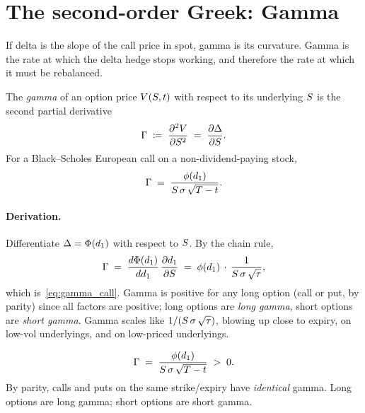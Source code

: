 \section{The second-order Greek: Gamma}
\label{sec:ch16_gamma}

If delta is the slope of the call price in spot, gamma is its
curvature. Gamma is the rate at which the delta hedge stops working,
and therefore the rate at which it must be rebalanced.

\begin{definition}[Gamma]
The \emph{gamma} of an option price $V(S, t)$ with respect to its
underlying $S$ is the second partial derivative
\begin{equation}
  \Gamma \;\coloneqq\; \frac{\partial^2 V}{\partial S^2}
                 \;=\; \frac{\partial \Delta}{\partial S}.
  \label{eq:gamma_def}
\end{equation}
For a Black--Scholes European call on a non-dividend-paying stock,
\begin{equation}
  \Gamma \;=\; \frac{\phi(d_1)}{S\,\sigma\,\sqrt{T - t}}.
  \label{eq:gamma_call}
\end{equation}
\end{definition}

\paragraph{Derivation.} Differentiate $\Delta = \Phi(d_1)$ with
respect to $S$. By the chain rule,
\begin{equation*}
  \Gamma \;=\; \frac{d \Phi(d_1)}{d d_1}\,\frac{\partial d_1}{\partial S}
        \;=\; \phi(d_1)\,\cdot\,\frac{1}{S\,\sigma\,\sqrt{\tau}},
\end{equation*}
which is~\eqref{eq:gamma_call}. Gamma is positive for any long
option (call or put, by parity) since all factors are positive;
long options are \emph{long gamma}, short options are \emph{short
gamma}. Gamma scales like $1/(S\,\sigma\,\sqrt\tau)$, blowing up
close to expiry, on low-vol underlyings, and on low-priced
underlyings.

\begin{keyfactbox}
\begin{equation*}
  \Gamma \;=\; \frac{\phi(d_1)}{S\,\sigma\,\sqrt{T - t}} \;>\; 0.
\end{equation*}
By parity, calls and puts on the same strike/expiry have
\emph{identical} gamma. Long options are long gamma; short options
are short gamma.
\end{keyfactbox}

